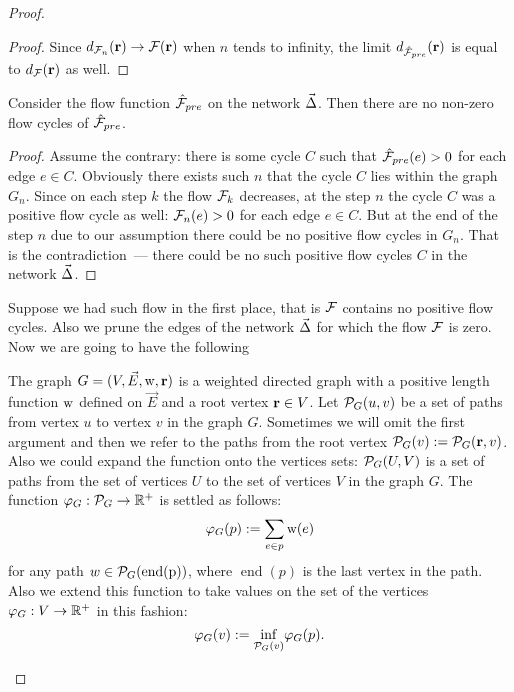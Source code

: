 \documentclass[12pt]{article}
\begin{document}
\begin{proof}
\begin{proof}
        Since $d_{\mathcal{F}_{n}}(\mathbf{r}) \to \mathcal{F}(\mathbf{r})$ when $n$ tends to infinity,
          the limit $d_{\mathcal{\hat{F}}_{pre}}(\mathbf{r})$ is equal to $d_{\mathcal{F}}(\mathbf{r})$ as well.
      \end{proof}
      \begin{prop}
        Consider the flow function $\mathcal{\hat{F}}_{pre}$ on the network $\vec{\Delta}$.
        Then there are no non-zero flow cycles of $\mathcal{\hat{F}}_{pre}$.
      \end{prop}
      \begin{proof}
        Assume the contrary: there is some cycle $C$ such that $\mathcal{\hat{F}}_{pre}(e) > 0$ for
          each edge $e \in C$.
        Obviously there exists such $n$ that the cycle $C$ lies within the graph $G_n$.
        Since on each step $k$ the flow $\mathcal{F}_{k}$ decreases, at the step $n$
          the cycle $C$ was a positive flow cycle as well: $\mathcal{F}_{n}(e) > 0$ for each edge $e \in C$.
        But at the end of the step $n$ due to our assumption there could be no positive flow cycles in $G_n$.
        That is the contradiction~--- there could be no such positive flow cycles $C$ in the network $\vec{\Delta}$.
      \end{proof}
      Suppose we had such flow in the first place, that is $\mathcal{F}$ contains no positive flow cycles.
      Also we prune the edges of the network $\vec{\Delta}$ for which the flow $\mathcal{F}$ is zero.
      Now we are going to have the following
      \begin{definition}
        The graph $G = (V, \vec{E},\mathrm{w}, \mathbf{r})$ is a weighted directed graph with a positive
          length function $\mathrm{w}$ defined on $\vec{E}$ and a root vertex $\mathbf{r} \in V$.
        Let $\mathcal{P}_{G}(u, v)$ be a set of paths from vertex $u$ to vertex $v$ in the graph $G$.
        Sometimes we will omit the first argument and then we refer to the paths from the root vertex
          $\mathcal{P}_{G}(v) := \mathcal{P}_{G}(\mathbf{r}, v)$.
        Also we could expand the function onto the vertices sets: $\mathcal{P}_{G}(U,V)$ is a set of paths
          from the set of vertices $U$ to the set of vertices $V$ in the graph $G$.
        The function $\varphi_{G}: \mathcal{P}_{G} \to \mathbb{R}^{+}$ is settled as follows:
        \[
          \varphi_{G}(p) := \sum_{e \in p} \mathrm{w}(e)
        \]
        for any path $w \in \mathcal{P}_{G}(\operatorname{\operatorname{end}(p)})$, where $\operatorname{end}(p)$ is the last vertex in the path.
        Also we extend this function to take values on the set of the vertices $\varphi_{G}: V \to \mathbb{R}^{+}$ in this fashion:
        \[
          \varphi_{G}(v) := {\inf_{\mathcal{P}_{G}(v)}} \varphi_{G}(p).
        \]

\end{definition}
\end{proof}
\end{document}
